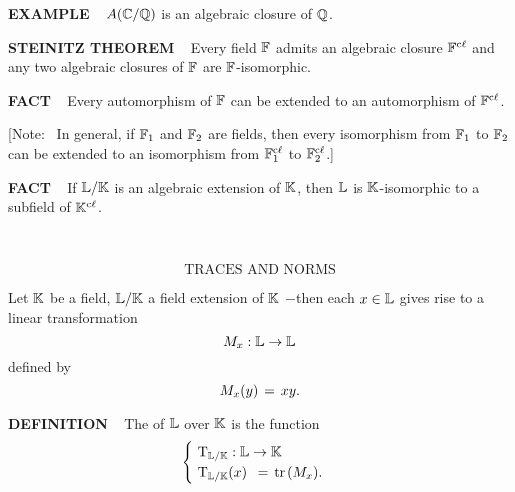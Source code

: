 \vspace{0.1cm}


\begin{x}{\small\bf EXAMPLE} \ %
$A(\mathbb{C}/\mathbb{Q})$ is an algebraic closure of $\mathbb{Q}$.
\end{x}

\vspace{0.1cm}


\begin{x}{\small\bf STEINITZ THEOREM} \ %
Every field $\mathbb{F}$ admits an algebraic closure $\mathbb{F}^{\text{c$\ell$}}$ and any two algebraic closures of $\mathbb{F}$ are 
$\mathbb{F}$-isomorphic.
\end{x}

\vspace{0.1cm}


\begin{x}{\small\bf FACT} \ %
Every automorphism of $\mathbb{F}$ can be extended to an automorphism of $\mathbb{F}^{\text{c$\ell$}}$.

\vspace{0.1cm}

[Note: \ In general, if $\mathbb{F}_1$ and $\mathbb{F}_2$ are fields, then every isomorphism from $\mathbb{F}_1$ to $\mathbb{F}_2$ can be extended to an 
isomorphism from $\mathbb{F}_1^{\text{c$\ell$}}$ to $\mathbb{F}_2^{\text{c$\ell$}}$.]

\end{x}

\vspace{0.1cm}


\begin{x}{\small\bf FACT} \ %
If $\mathbb{L} / \mathbb{K}$ is an algebraic extension of $\mathbb{K}$, then $\mathbb{L}$ is $\mathbb{K}$-isomorphic to a subfield of $\mathbb{K}^{\text{c$\ell$}}$.
\end{x}



\setcounter{theoremn}{0}

\newpage

\ \indent 

\[
\text{TRACES AND NORMS}
\]


Let $\mathbb{K}$ be a field, $\mathbb{L}/\mathbb{K}$ a field extension of $\mathbb{K}$ $-$then each $x \in \mathbb{L}$ gives rise to a linear transformation 
\[
M_x: \mathbb{L} \rightarrow \mathbb{L}
\]
defined by 
\[
M_x(y) \hspace{0.05cm} = \hspace{0.05cm} x y.
\]

\vspace{0.2cm}

\begin{x}{\small\bf DEFINITION} \ %
The 
\index{$\tT_{\LL/\K}$} 
of $\mathbb{L}$ over $\mathbb{K}$ is the function 
\[
\begin{cases}
\ \text{T}_{\mathbb{L}/\mathbb{K}}:\mathbb{L} \rightarrow \mathbb{K}\\
\ \text{T}_{\mathbb{L}/\mathbb{K}}(x) \ \hspace{0.05cm} = \hspace{0.05cm} \text{tr}\hspace{0.05cm}(M_x).
\end{cases}
\]
\end{x}

